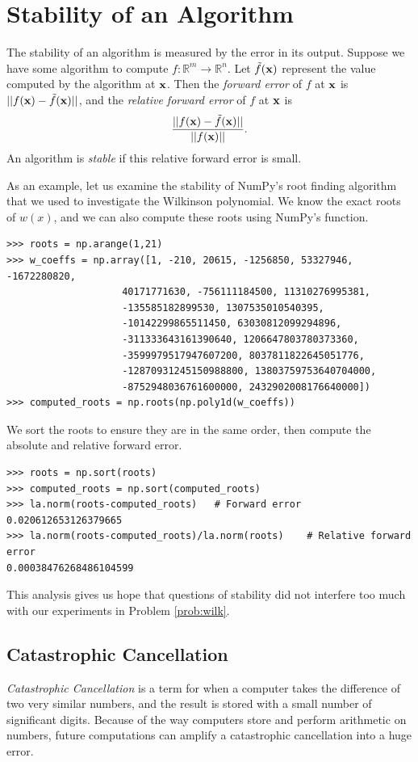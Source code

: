 \section*{Stability of an Algorithm}
The stability of an algorithm is measured by the error in its output. 
Suppose we have some algorithm to compute $f: \mathbb{R}^m \rightarrow \mathbb{R}^n$.
Let $\tilde f({\bf x})$ represent the value computed by the algorithm at ${\bf x}$.
Then the \emph{forward error} of $f$ at ${\bf x}$ is $||f({\bf x})-\tilde f({\bf x})||$, and the \emph{relative forward error} of $f$ at ${\bf x}$ is
\[
\frac{||f({\bf x})-\tilde f({\bf x})||}{||f({\bf x})||}.
\]
An algorithm is \emph{stable} if this relative forward error is small.

As an example, let us examine the stability of NumPy's root finding algorithm that we used to investigate the Wilkinson polynomial.
We know the exact roots of $w(x)$, and we can also compute these roots using NumPy's  function.
\begin{lstlisting}
>>> roots = np.arange(1,21)
>>> w_coeffs = np.array([1, -210, 20615, -1256850, 53327946, -1672280820,
                    40171771630, -756111184500, 11310276995381,
                    -135585182899530, 1307535010540395,
                    -10142299865511450, 63030812099294896,
                    -311333643161390640, 1206647803780373360,
                    -3599979517947607200, 8037811822645051776,
                    -12870931245150988800, 13803759753640704000,
                    -8752948036761600000, 2432902008176640000])
>>> computed_roots = np.roots(np.poly1d(w_coeffs))
\end{lstlisting}
We sort the roots to ensure they are in the same order, then compute the absolute and relative forward error.
\begin{lstlisting}
>>> roots = np.sort(roots)
>>> computed_roots = np.sort(computed_roots)
>>> la.norm(roots-computed_roots)	# Forward error
0.020612653126379665
>>> la.norm(roots-computed_roots)/la.norm(roots)	# Relative forward error
0.00038476268486104599
\end{lstlisting}

This analysis gives us hope that questions of stability did not interfere too much with our experiments in Problem \ref{prob:wilk}.

\subsection*{Catastrophic Cancellation}
\emph{Catastrophic Cancellation} is a term for when a computer takes the difference of two very similar numbers, and the result is stored with a small number of significant digits.
Because of the way computers store and perform arithmetic on numbers, future computations can amplify a catastrophic cancellation into a huge error.

